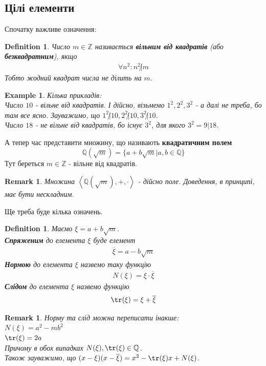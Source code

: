 \documentclass[a4paper, 10pt]{article}
\theoremstyle{theoremdd}
\theoremstyle{theoremdd}
\newtheorem{definition}[theorem]{Definition}
\theoremstyle{theoremdd}
\theoremstyle{theoremdd}
\newtheorem{example}[theorem]{Example}
\theoremstyle{theoremdd}
\theoremstyle{theoremdd}
\newtheorem{remark}[theorem]{Remark}
\theoremstyle{theoremdd}
\theoremstyle{theoremdd}
\begin{document}
\subsection{Цілі елементи}
Спочатку важливе означення:
\begin{definition}
Число $m \in \mathbb{Z}$ називається \textbf{вільним від квадратів} (або \textbf{безквадратним}), якщо
\begin{align*}
\forall n^2: n^2 \not| m
\end{align*}
Тобто жодний квадрат числа не ділить на $m$.
\end{definition}

\begin{example}
Кілька прикладів:\\
Число $10$ - вільне від квадратів. І дійсно, візьмемо $1^2,2^2,3^2$ - а далі не треба, бо там все ясно. Зауважимо, що $1^2 \not| 10, 2^2 \not| 10, 3^2 \not| 10$.
\bigskip \\
Число $18$ - не вільне від квадратів, бо існує $3^2$, для якого $3^2 = 9 | 18$.
\end{example}

А тепер час представити множину, що називають \textbf{квадратичним полем}
$$ \mathbb{Q}(\sqrt{m}) = \{a + b \sqrt{m} | a,b \in \mathbb{Q}\} $$
Тут береться $m \in \mathbb{Z}$ - вільне від квадратів.

\begin{remark}
Множина $\left< \mathbb{Q}(\sqrt{m}), +, \cdot \right>$ - дійсно поле. Доведення, в принципі, має бути нескладним.
\end{remark}

Ще треба буде кілька означень.
\begin{definition}
Маємо $\xi = a + b\sqrt{m}$.\\
\textbf{Спряженим} до елемента $\xi$ буде елемент
\begin{align*}
\overline{\xi} = a - b \sqrt{m}
\end{align*}
\textbf{Нормою} до елемента $\xi$ назвемо таку функцію
\begin{align*}
N(\xi) = \xi \cdot \overline{\xi}
\end{align*}
\textbf{Слідом} до елемента $\xi$ назвемо функцію
\begin{align*}
\tr (\xi) = \xi + \overline{\xi}
\end{align*}
\end{definition}

\begin{remark}
Норму та слід можна переписати інакше:\\
$N(\xi) = a^2 - mb^2$\\
$\tr(\xi) = 2a$\\
Причому в обох випадках $N(\xi), \tr(\xi) \in \mathbb{Q}$.
\bigskip \\
Також зауважимо, що $(x-\xi)(x-\overline{\xi}) = x^2- \tr(\xi)x + N(\xi)$.
\end{remark}
\end{document}
